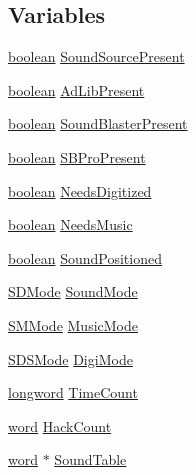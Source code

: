 \subsection*{Variables}
\begin{DoxyCompactItemize}
\item 
\hyperlink{ID__HEAD_8H_a7c6368b321bd9acd0149b030bb8275ed}{boolean} \hyperlink{ID__SD_8C_ad1e0e8f0ed866e2473d8915e769852c5}{SoundSourcePresent}
\item 
\hyperlink{ID__HEAD_8H_a7c6368b321bd9acd0149b030bb8275ed}{boolean} \hyperlink{ID__SD_8C_aae5cf4d134b52966bc2aa3de22b0dd03}{AdLibPresent}
\item 
\hyperlink{ID__HEAD_8H_a7c6368b321bd9acd0149b030bb8275ed}{boolean} \hyperlink{ID__SD_8C_a339e21cdf208764078f89b5b5f72932b}{SoundBlasterPresent}
\item 
\hyperlink{ID__HEAD_8H_a7c6368b321bd9acd0149b030bb8275ed}{boolean} \hyperlink{ID__SD_8C_afea4696d6833498198ec4a492d05a80e}{SBProPresent}
\item 
\hyperlink{ID__HEAD_8H_a7c6368b321bd9acd0149b030bb8275ed}{boolean} \hyperlink{ID__SD_8C_a3fef6357a944508b700309276a423872}{NeedsDigitized}
\item 
\hyperlink{ID__HEAD_8H_a7c6368b321bd9acd0149b030bb8275ed}{boolean} \hyperlink{ID__SD_8C_aa073cdf1c0836ab07a66b9e73bfe89cd}{NeedsMusic}
\item 
\hyperlink{ID__HEAD_8H_a7c6368b321bd9acd0149b030bb8275ed}{boolean} \hyperlink{ID__SD_8C_a99325c606c4f55b472ccc411b1b2bb02}{SoundPositioned}
\item 
\hyperlink{ID__SD_8H_af66c128f54042fe02b7297e3e29a8b6d}{SDMode} \hyperlink{ID__SD_8C_ae78ec490e7f5cbb26c649cc4034546f7}{SoundMode}
\item 
\hyperlink{ID__SD_8H_ac43ff64e0d1da85aa6fee6723a38a4de}{SMMode} \hyperlink{ID__SD_8C_afcbed1bc96a4997c02b2eb0143c57ba5}{MusicMode}
\item 
\hyperlink{ID__SD_8H_a5d22d74f0369393939a5d3cf1dcfdaf3}{SDSMode} \hyperlink{ID__SD_8C_ad359668c13523a90cddba7728a33fab9}{DigiMode}
\item 
\hyperlink{ID__HEAD_8H_a8a9a7dd50c6fdb45dcdf0eb929479663}{longword} \hyperlink{ID__SD_8C_afae310dc5c7e77f2742ddbfc16b98dd0}{TimeCount}
\item 
\hyperlink{ID__HEAD_8H_abad51e07ab6d26bec9f1f786c8d65bcd}{word} \hyperlink{ID__SD_8C_af0246b76813385402f7225b423d65c28}{HackCount}
\item 
\hyperlink{ID__HEAD_8H_abad51e07ab6d26bec9f1f786c8d65bcd}{word} $\ast$ \hyperlink{ID__SD_8C_ac4dbee182539e544f1fa2c52de9fd35c}{SoundTable}

\end{DoxyCompactItemize}
